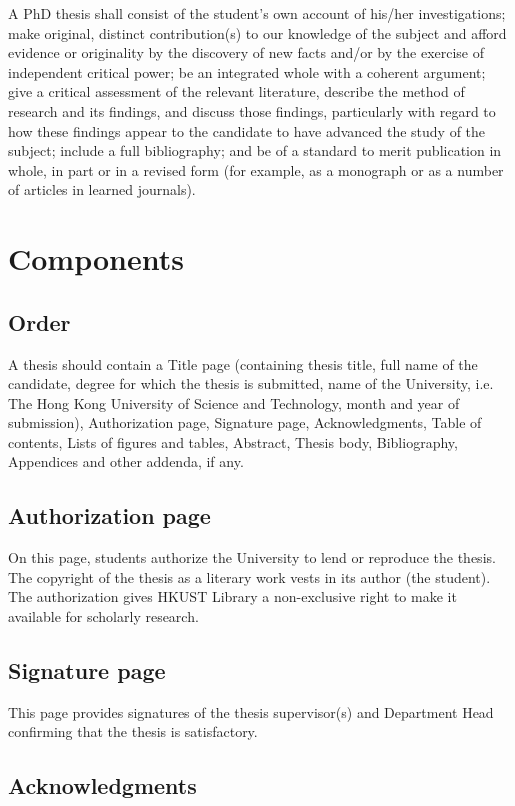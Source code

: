 A PhD thesis shall consist of the student's own account of his/her investigations; make original, distinct contribution(s) to our knowledge of the subject and afford evidence or originality by the discovery of new facts and/or by the exercise of independent critical power; be an integrated whole with a coherent argument; give a critical assessment of the relevant literature, describe the method of research and its findings, and discuss those findings, particularly with regard to how these findings appear to the candidate to have advanced the study of the subject; include a full bibliography; and be of a standard to merit publication in whole, in part or in a revised form (for example, as a monograph or as a number of articles in learned journals).

\section{Components}
\subsection{Order}

A thesis should contain a Title page (containing thesis title, full name of the candidate, degree for which the thesis is submitted, name of the University, i.e. The Hong Kong University of Science and Technology, month and year of submission), Authorization page, Signature page, Acknowledgments, Table of contents, Lists of figures and tables, Abstract, Thesis body, Bibliography, Appendices and other addenda, if any.

\subsection{Authorization page}

On this page, students authorize the University to lend or reproduce the thesis. The copyright of the thesis as a literary work vests in its author (the student). The authorization gives HKUST Library a non-exclusive right to make it available for scholarly research.

\subsection{Signature page}

This page provides signatures of the thesis supervisor(s) and Department Head confirming that the thesis is satisfactory.

\subsection{Acknowledgments}

